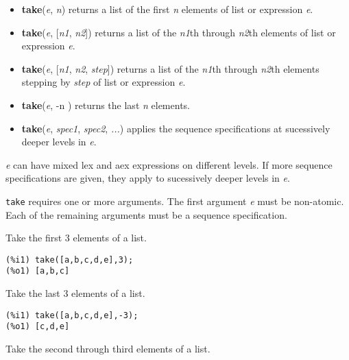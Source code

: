 \documentclass[]{article}
\begin{document}
\vspace{5 pt}
\begin{itemize}
\item[] {\bf take}({\it e}, {\it n})
  returns a list of the first {\it n} elements of list or expression {\it e}. 

\item[] {\bf take}({\it e}, [{\it n1}, {\it n2}])
  returns a list of the {\it n1}th through {\it n2}th elements of list or expression {\it e}. 

\item[] {\bf take}({\it e}, [{\it n1}, {\it n2}, {\it step}])
  returns a list of the {\it n1}th through {\it n2}th elements stepping by {\it step} of list or expression {\it e}. 

\item[] {\bf take}({\it e}, -n )
  returns the last {\it n} elements. 

\item[] {\bf take}({\it e}, {\it spec1}, {\it spec2}, {\it ...})
  applies the sequence specifications at sucessively deeper levels in {\it e}. 

\end{itemize}
{\it e} can have mixed lex and aex expressions on different levels. If more sequence specifications are given, they apply to sucessively deeper levels in {\it e}. 

\vspace{5 pt}

   {\tt take} requires one or more arguments. The first argument {\it e} must be non-atomic.
   Each of the remaining arguments must be a sequence specification.


\vspace{5 pt}


   Take the first 3 elements of a list. 

\begin{Verbatim}[frame=single]
(%i1) take([a,b,c,d,e],3);
(%o1) [a,b,c]
\end{Verbatim}

   Take the last 3 elements of a list. 

\begin{Verbatim}[frame=single]
(%i1) take([a,b,c,d,e],-3);
(%o1) [c,d,e]
\end{Verbatim}

   Take the second through third elements of a list. 
\end{document}
